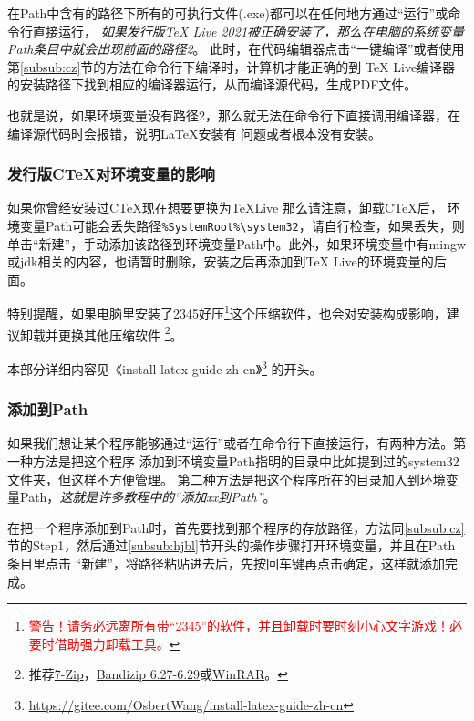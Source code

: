 在Path中含有的路径下所有的可执行文件(.exe)都可以在任何地方通过“运行”或命令行直接运行，
\emph{如果发行版\TeX{} Live 2021被正确安装了，那么在电脑的系统变量Path条目中就会出现前面的路径2}。
此时，在代码编辑器点击“一键编译”或者使用第\ref{subsub:cz}节的方法在命令行下编译时，计算机才能正确的到
\TeX{} Live编译器的安装路径下找到相应的编译器运行，从而编译源代码，生成PDF文件。

也就是说，如果环境变量没有路径2，那么就无法在命令行下直接调用编译器，在编译源代码时会报错，说明\LaTeX{}安装有
问题或者根本没有安装。



\subsubsection{发行版C\TeX{}对环境变量的影响}


如果你曾经安装过C\TeX{}现在想要更换为\TeX Live 那么请注意，卸载C\TeX{}后，
环境变量Path可能会丢失路径\verb"%SystemRoot%\system32"，请自行检查，如果丢失，则
单击“新建”，手动添加该路径到环境变量Path中。此外，如果环境变量中有mingw或jdk相关的内容，也请暂时删除，安装之后再添加到\TeX{} Live的环境变量的后面。

特别提醒，如果电脑里安装了2345好压\footnote{\textcolor{red}{警告！请务必远离所有带“2345”的软件，并且卸载时要时刻小心文字游戏！必要时借助强力卸载工具。}}这个压缩软件，也会对安装构成影响，建议卸载并更换其他压缩软件
\footnote{推荐\href{https://sourceforge.net/projects/sevenzip/}{7-Zip}，\href{https://www.bandisoft.com/bandizip/}{Bandizip 6.27-6.29}或\href{http://www.winrar.com.cn/}{WinRAR}。}。

本部分详细内容见《install-latex-guide-zh-cn》\footnote{\url{https://gitee.com/OsbertWang/install-latex-guide-zh-cn}}
的开头。



\subsubsection{添加到Path}


如果我们想让某个程序能够通过“运行”或者在命令行下直接运行，有两种方法。第一种方法是把这个程序
添加到环境变量Path指明的目录中比如提到过的system32文件夹，但这样不方便管理。
第二种方法是把这个程序所在的目录加入到环境变量Path，\emph{这就是许多教程中的“添加xx到Path”}。

在把一个程序添加到Path时，首先要找到那个程序的存放路径，方法同\ref{subsub:cz}节的Step1，然后通过\ref{subsub:hjbl}节开头的操作步骤打开环境变量，并且在Path条目里点击
“新建”，将路径粘贴进去后，先按回车键再点击确定，这样就添加完成。

